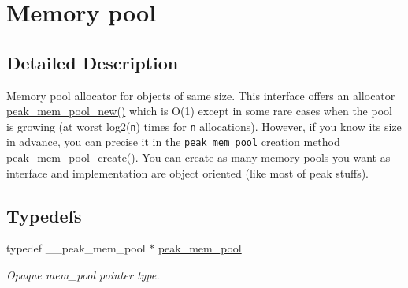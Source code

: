 \hypertarget{group__mem__pool}{
\section{Memory pool}
\label{group__mem__pool}
}


\subsection{Detailed Description}
\begin{Desc}
\item[]Memory pool allocator for objects of same size. This interface offers an allocator \hyperlink{group__mem__pool_ga9}{peak\_\-mem\_\-pool\_\-new()} which is O(1) except in some rare cases when the pool is growing (at worst log2({\tt n}) times for {\tt n} allocations). However, if you know its size in advance, you can precise it in the {\tt peak\_\-mem\_\-pool} creation method \hyperlink{group__mem__pool_ga7}{peak\_\-mem\_\-pool\_\-create()}. You can create as many memory pools you want as interface and implementation are object oriented (like most of peak stuffs). \end{Desc}


\subsection*{Typedefs}
\begin{CompactItemize}
\item 
\hypertarget{group__mem__pool_ga0}{
typedef \_\-\_\-peak\_\-mem\_\-pool $\ast$ \hyperlink{group__mem__pool_ga0}{peak\_\-mem\_\-pool}}
\label{group__mem__pool_ga0}

\begin{CompactList}\small\item\em Opaque mem\_\-pool pointer type. \item\end{CompactList}\end{CompactItemize}
